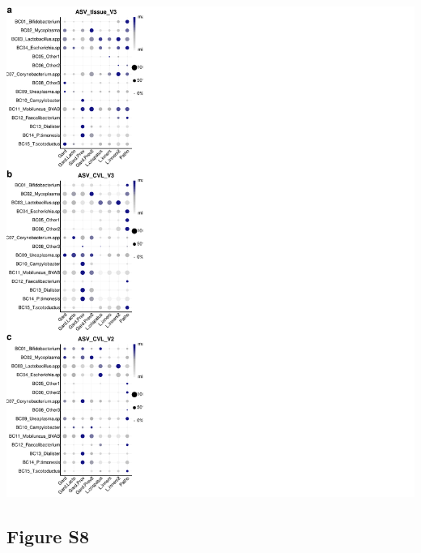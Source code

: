 \documentclass[
]{article}
\begin{document}
\includegraphics[width=1\linewidth]{manuscript_template_files/figure-latex/unnamed-chunk-16-1}

\clearpage

\hypertarget{figure-s8}{%
\subsection{Figure S8}\label{figure-s8}}
\end{document}
